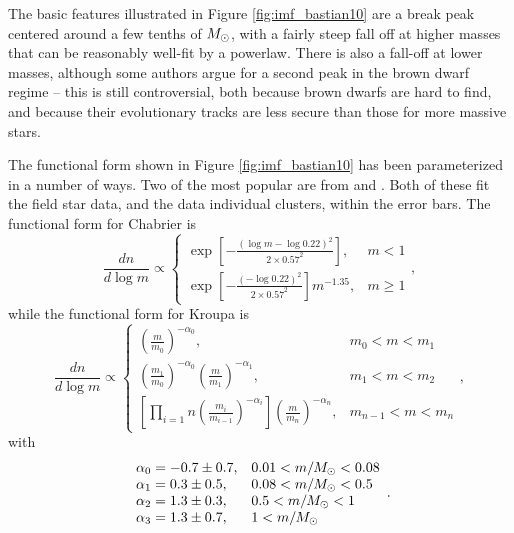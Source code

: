The basic features illustrated in Figure \ref{fig:imf_bastian10} are a break peak centered around a few tenths of $M_{\odot}$, with a fairly steep fall off at higher masses that can be reasonably well-fit by a powerlaw. There is also a fall-off at lower masses, although some authors argue for a second peak in the brown dwarf regime -- this is still controversial, both because brown dwarfs are hard to find, and because their evolutionary tracks are less secure than those for more massive stars.

 The functional form shown in Figure \ref{fig:imf_bastian10} has been parameterized in a number of ways. Two of the most popular are from \citet{kroupa01a, kroupa02c} and \citet{chabrier03a, chabrier05a}. Both of these fit the field star data, and the data individual clusters, within the error bars. The functional form for Chabrier is
\begin{equation}
\label{eq:chabrier}
\frac{dn}{d\log m} \propto 
\left\{
\begin{array}{ll}
\exp\left[-\frac{(\log m-\log 0.22)^2}{2\times 0.57^2}\right], &
m<1 \\
\exp\left[-\frac{(-\log 0.22)^2}{2\times 0.57^2}\right] m^{-1.35}, &
m\ge 1
\end{array}
\right.,
\end{equation}
while the functional form for Kroupa is
\begin{equation}
\label{eq:kroupa}
\frac{dn}{d\log m} \propto
\left\{
\begin{array}{ll}
\left(\frac{m}{m_0}\right)^{-\alpha_0}, & m_0 < m < m_1\\
\left(\frac{m_1}{m_0}\right)^{-\alpha_0} \left(\frac{m}{m_1}\right)^{-\alpha_1}, &
m_1 < m < m_2 \\
\left[\prod_{i=1}{n} \left(\frac{m_i}{m_{i-1}}\right)^{-\alpha_i}\right] \left(\frac{m}{m_n}\right)^{-\alpha_n}, &
m_{n-1} < m < m_n
\end{array}
\right.,
\end{equation}
with
\begin{equation}
\begin{array}{ll}
\alpha_0 = -0.7\pm 0.7, & 0.01 < m/M_{\odot} < 0.08 \\
\alpha_1 = 0.3\pm 0.5, & 0.08 < m/M_{\odot} < 0.5 \\
\alpha_2 = 1.3\pm 0.3, & 0.5 < m/M_{\odot} < 1 \\
\alpha_3 = 1.3\pm 0.7, & 1 < m/M_{\odot} \\
\end{array}.
\end{equation}

